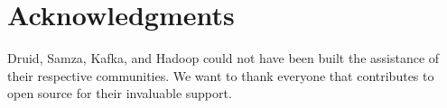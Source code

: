 \documentclass{vldb}
\begin{document}

\balance

\section{Acknowledgments}
Druid, Samza, Kafka, and Hadoop could not have been built the assistance of
their respective communities. We want to thank everyone that contributes to
open source for their invaluable support.


\end{document}
